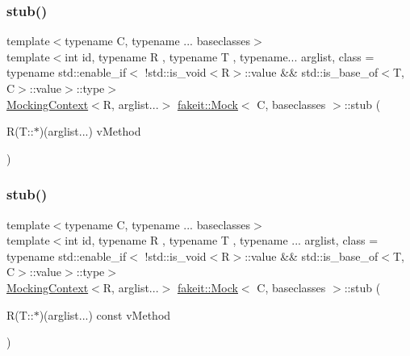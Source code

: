 \mbox{\label{classfakeit_1_1Mock_a69141994a924c71af3bf9cb4d5a998b6}} 
\subsubsection{\texorpdfstring{stub()}{stub()}\hspace{0.1cm}{\footnotesize\ttfamily [60/72]}}
{\footnotesize\ttfamily template$<$typename C, typename ... baseclasses$>$ \\
template$<$int id, typename R , typename T , typename... arglist, class  = typename std\+::enable\+\_\+if$<$                !std\+::is\+\_\+void$<$\+R$>$\+::value \&\& std\+::is\+\_\+base\+\_\+of$<$\+T, C$>$\+::value$>$\+::type$>$ \\
\mbox{\hyperlink{classfakeit_1_1MockingContext}{Mocking\+Context}}$<$R, arglist...$>$ \mbox{\hyperlink{classfakeit_1_1Mock}{fakeit\+::\+Mock}}$<$ C, baseclasses $>$\+::stub (\begin{DoxyParamCaption}\item[{R(T\+::$\ast$)(arglist...)}]{v\+Method }\end{DoxyParamCaption})\hspace{0.3cm}{\ttfamily [inline]}}

\mbox{\label{classfakeit_1_1Mock_a7a8f38b58b068b35f263eee42d75c162}} 
\subsubsection{\texorpdfstring{stub()}{stub()}\hspace{0.1cm}{\footnotesize\ttfamily [61/72]}}
{\footnotesize\ttfamily template$<$typename C, typename ... baseclasses$>$ \\
template$<$int id, typename R , typename T , typename ... arglist, class  = typename std\+::enable\+\_\+if$<$                !std\+::is\+\_\+void$<$\+R$>$\+::value \&\& std\+::is\+\_\+base\+\_\+of$<$\+T, C$>$\+::value$>$\+::type$>$ \\
\mbox{\hyperlink{classfakeit_1_1MockingContext}{Mocking\+Context}}$<$R, arglist...$>$ \mbox{\hyperlink{classfakeit_1_1Mock}{fakeit\+::\+Mock}}$<$ C, baseclasses $>$\+::stub (\begin{DoxyParamCaption}\item[{R(T\+::$\ast$)(arglist...) const}]{v\+Method }\end{DoxyParamCaption})\hspace{0.3cm}{\ttfamily [inline]}}

